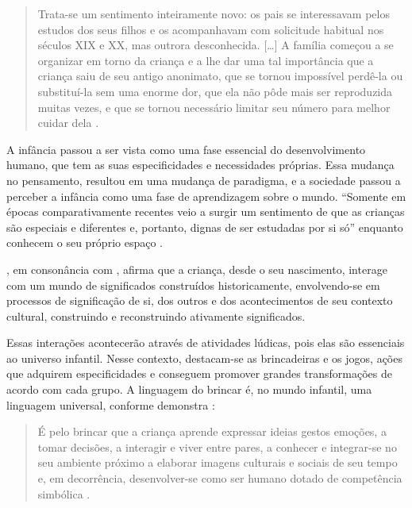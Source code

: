 \begin{refsection}
    \begin{quotation}
        Trata-se um sentimento inteiramente novo: os pais se interessavam pelos estudos dos seus filhos e os acompanhavam com solicitude habitual nos séculos XIX e XX, mas outrora desconhecida. [\dots] A família começou a se organizar em torno da criança e a lhe dar uma tal importância que a criança saiu de seu antigo anonimato, que se tornou impossível perdê-la ou substituí-la sem uma enorme dor, que ela não pôde mais ser reproduzida muitas vezes, e que se tornou necessário limitar seu número para melhor cuidar dela \cite[p.~12]{ARIÈS1981História}. 
    \end{quotation}

    A infância passou a ser vista como uma fase essencial do desenvolvimento humano, que tem as suas especificidades e necessidades próprias. Essa mudança no pensamento, resultou em uma mudança de paradigma, e a sociedade passou a perceber a infância como uma fase de aprendizagem sobre o mundo. “Somente em épocas comparativamente recentes veio a surgir um sentimento de que as crianças são especiais e diferentes e, portanto, dignas de ser estudadas por si só” enquanto conhecem o seu próprio espaço \cite[p.~10]{HEYWOOD2004Uma}. 

    \textcite{PEDROSA1996emergência}, em consonância com \textcite{VALSINER1988Ontogeny}, afirma que a criança, desde o seu nascimento, interage com um mundo de significados construídos historicamente, envolvendo-se em processos de significação de si, dos outros e dos acontecimentos de seu contexto cultural, construindo e reconstruindo ativamente significados. 

    Essas interações acontecerão através de atividades lúdicas, pois elas são essenciais ao universo infantil. Nesse contexto, destacam-se as brincadeiras e os jogos, ações que adquirem especificidades e conseguem promover grandes transformações de acordo com cada grupo. A linguagem do brincar é, no mundo infantil, uma linguagem universal, conforme demonstra \textcite{LUCKESI2004Estados}: 

    \begin{quotation}
        É pelo brincar que a criança aprende expressar ideias gestos emoções, a tomar decisões, a interagir e viver entre pares, a conhecer e integrar-se no seu ambiente próximo a elaborar imagens culturais e sociais de seu tempo e, em decorrência, desenvolver-se como ser humano dotado de competência simbólica \cite[p.~11]{LUCKESI2004Estados}. 
    \end{quotation}


\end{refsection}

